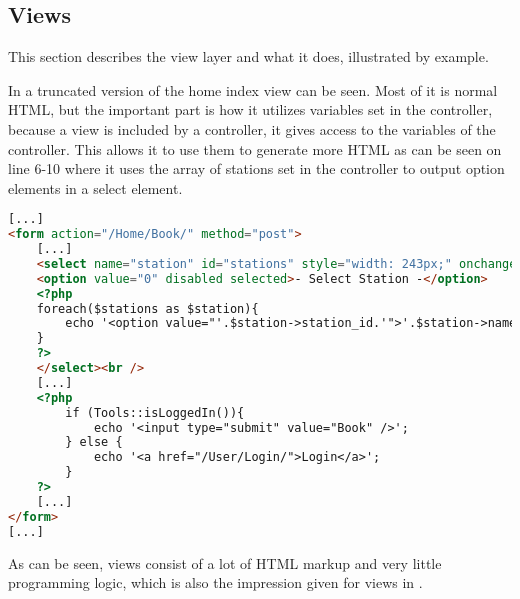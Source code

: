 \subsection{Views}
This section describes the view layer and what it does, illustrated by example.

In  a truncated version of the home index view can be seen. 
Most of it is normal HTML, but the important part is how it utilizes variables set in the controller, because a view is included by a controller, it gives access to the variables of the controller. 
This allows it to use them to generate more HTML as can be seen on line 6-10 where it uses the array of stations set in the controller to output option elements in a select element.

\begin{lstlisting}[language=html, label=lst:homeIndexView, caption={Home Index View.}]
[...]
<form action="/Home/Book/" method="post">
    [...]
    <select name="station" id="stations" style="width: 243px;" onchange="UpdateMarker()">
    <option value="0" disabled selected>- Select Station -</option>
    <?php
    foreach($stations as $station){
        echo '<option value="'.$station->station_id.'">'.$station->name.'</option>';
    }
    ?>
    </select><br />
    [...]
    <?php
        if (Tools::isLoggedIn()){
            echo '<input type="submit" value="Book" />';
        } else {
            echo '<a href="/User/Login/">Login</a>';
        }
    ?>
    [...]
</form>
[...]
\end{lstlisting}

As can be seen, views consist of a lot of HTML markup and very little programming logic, which is also the impression given for views in .
